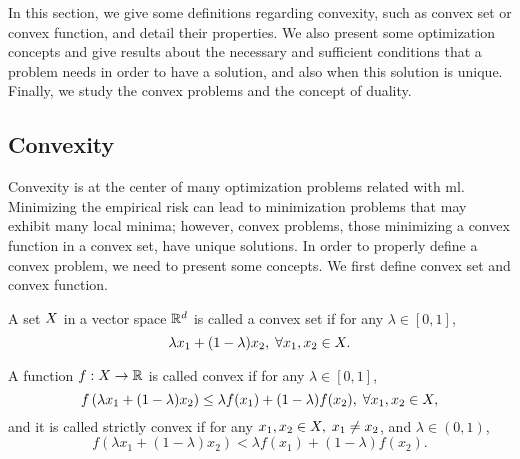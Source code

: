 %

In this section, we give some definitions regarding convexity, such as convex set or convex function, and detail their properties.
%
We also present some optimization concepts and give results about the necessary and sufficient conditions that a problem needs in order to have a solution, and also when this solution is unique.
%
Finally, we study the convex problems and the concept of duality.






\subsection{Convexity}
Convexity is at the center of many optimization problems related with \acrshort{ml}.
Minimizing the empirical risk can lead to minimization problems that may exhibit many local minima; however, convex problems, those minimizing a convex function in a convex set, have unique solutions.
In order to properly define a convex problem, we need to present some concepts.  
We first define convex set and convex function.
\begin{definition}
    A set $X$ in a vector space $\mathbb{R}^d$ is called a convex set if for any $\lambda \in [0, 1]$,
    \begin{equation}
        \nonumber
        \lambda x_1 + (1 - \lambda) x_2 , \; \forall x_1, x_2 \in X .
    \end{equation}
\end{definition}

\begin{definition}
    A function $f: X \to \mathbb{R}$ is called convex if for any $\lambda \in [0, 1]$,
    \begin{equation}
        \nonumber
        f\left(\lambda x_1 + (1 - \lambda) x_2 \right) \leq \lambda f(x_1) + (1 - \lambda) f(x_2) , \; \forall x_1, x_2 \in X ,
    \end{equation}
    and it is called strictly convex if for any $x_1, x_2 \in X, \; x_1 \neq x_2$, and $\lambda \in (0, 1)$,
    \begin{equation}
        \nonumber
        f\left(\lambda x_1 + (1 - \lambda) x_2 \right) < \lambda f(x_1) + (1 - \lambda) f(x_2) .
    \end{equation}
\end{definition}

